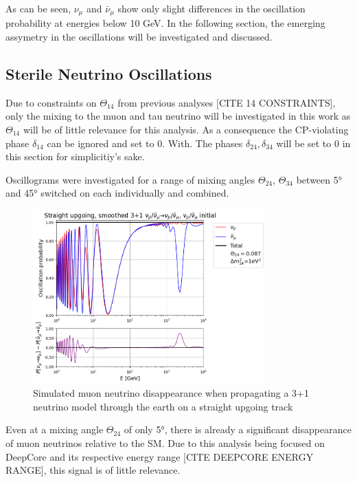 \documentclass[a4paper,12pt,numbered]{article}
\begin{document}
As can be seen, $\nu_\mu$ and $\bar{\nu}_\mu$ show only slight differences in the oscillation probability at energies below 10 GeV. In the following section, the emerging assymetry in the oscillations will be investigated and discussed.

\subsection{Sterile Neutrino Oscillations}

Due to constraints on $\Theta_{14}$ from previous analyses [CITE 14 CONSTRAINTS], only the mixing to the muon and tau neutrino will be investigated in this work as $\Theta_{14}$ will be of little relevance for this analysis. As a consequence the CP-violating phase $\delta_{14}$ can be ignored and set to 0. With. The phases $\delta_{24}, \delta_{34}$ will be set to 0 in this section for simplicitiy's sake.

Oscillograms were investigated for a range of mixing angles $\Theta_{24}$, $\Theta_{34}$ between 5° and 45° switched on each individually and combined.

\begin{figure}[H]
\centering
\includegraphics[width=0.8\textwidth]{Graphics/SterileOscParameters/0.087_th24_smoothed_osc_diff_mu.png}
\caption{Simulated muon neutrino disappearance when propagating a 3+1 neutrino model through the earth on a straight upgoing track}
\end{figure}

Even at a mixing angle $\Theta_{24}$ of only 5°, there is already a significant disappearance of muon neutrinos relative to the SM. Due to this analysis being focused on DeepCore and its respective energy range [CITE DEEPCORE ENERGY RANGE], this signal is of little relevance.
\end{document}
